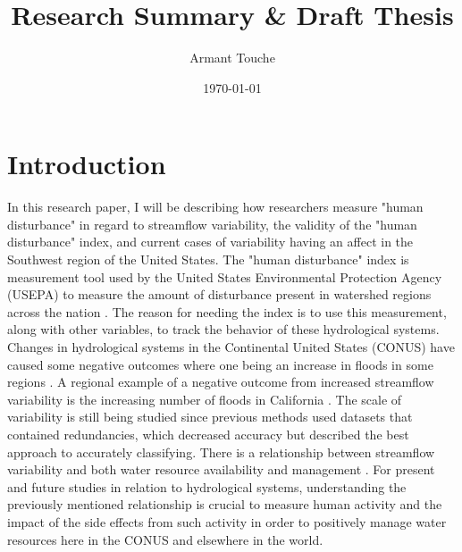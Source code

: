 \documentclass[a4paper,man,biblatex]{apa6}
\title{Research Summary \& Draft Thesis}
\author{Armant Touche}
\affiliation{Portland State University}
\date{\today}
\begin{document}
\thispagestyle{otherpage}
\setcounter{biburllcpenalty}{7000}
\setcounter{biburlucpenalty}{8000}


\section{Introduction} In this research paper, I will be describing how researchers measure "human disturbance" in regard to streamflow variability, the validity of the "human disturbance" index, and current cases of variability having an affect in the Southwest region of the United States. The "human disturbance" index is measurement tool used by the United States Environmental Protection Agency (USEPA) to measure the amount of disturbance present in watershed regions across the nation \autocite{falcone_2016}. The reason for needing the index is to use this measurement, along with other variables, to track the behavior of these hydrological systems. Changes in hydrological systems in the Continental United States (CONUS) have caused some negative outcomes where one being an increase in floods in some regions \autocite{rice_2016}. A regional example of a negative outcome from increased streamflow variability is the increasing number of floods in California \autocite{standford_2020}. The scale of variability is still being studied since previous methods used datasets that contained redundancies, which decreased accuracy but \textcite{falcone_2016} described the best approach to accurately classifying. There is a relationship between streamflow variability and both water resource availability and management \autocite{rice_2016}. For present and future studies in relation to hydrological systems, understanding the previously mentioned relationship is crucial to measure human activity and the impact of the side effects from such activity in order to positively manage water resources here in the CONUS and elsewhere in the world.
\medskip
\end{document}
